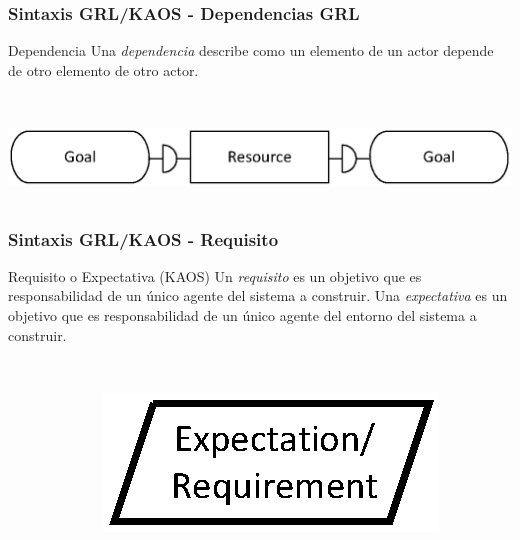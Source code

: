 \documentclass[handout,slidestop,xcolor=pst,dvips,blue]{beamer}
\begin{document}
\begin{frame}[t]
	\frametitle{Sintaxis GRL/KAOS - Dependencias GRL}
	\begin{block}{Dependencia}
		Una \alert{\emph{dependencia}} describe como un elemento de un actor depende de otro  elemento de otro actor.
		\ \\
		\ \\
		\begin{columns}
			\begin{column}{\linewidth}
				\centering \includegraphics[width=0.75\columnwidth,keepaspectratio=true]{images/objetivos/dependency(GRL).eps}
			\end{column}
		\end{columns}
	\end{block}
\end{frame}

\begin{frame}[c]
    \frametitle{Sintaxis GRL/KAOS - Requisito}
    \begin{block}{Requisito o Expectativa (KAOS)}
        Un \alert{\emph{requisito}} es un objetivo que es responsabilidad de un único agente del sistema a construir. Una \alert{\emph{expectativa}} es un objetivo que es responsabilidad de un único agente del entorno del sistema a construir.
        \ \\
        \ \\
        \begin{columns}[c]
            \begin{column}{0.50\linewidth}
            \end{column}
            \begin{column}{0.50\linewidth}
                \centering \includegraphics[width=0.50\columnwidth,keepaspectratio=true]{images/objetivos/expectation(KAOS).eps}
            \end{column}
        \end{columns}
     \end{block}
\end{frame}
\end{document}
